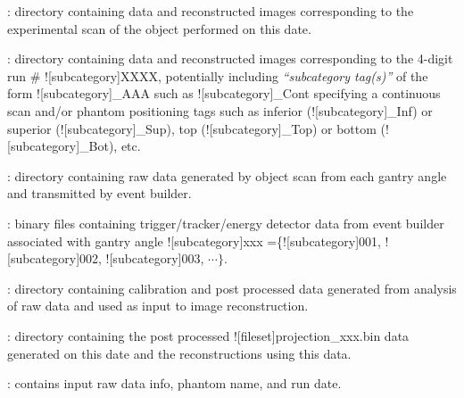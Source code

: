 \begin{tcbenvironment}
\begin{tcbparagraph}
\begin{ThinEnum}
\begin{ThinEnum}
\begin{ThinEnum}
                \item {} : directory containing data and reconstructed images corresponding to the experimental scan of the object performed on this date.
                \begin{ThinEnum}
                    \item {} : directory containing data and reconstructed images corresponding to the 4-digit run \# \docentry![subcategory]{XXXX}, potentially including \emph{``subcategory tag(s)''} of the form \docentry![subcategory]{\_AAA} such as  \docentry![subcategory]{\_Cont} specifying a continuous scan and/or phantom positioning tags such as inferior (\docentry![subcategory]{\_Inf}) or superior (\docentry![subcategory]{\_Sup}), top (\docentry![subcategory]{\_Top}) or bottom (\docentry![subcategory]{\_Bot}), etc.
                    \begin{ThinEnum}
                        \item {} : directory containing raw data generated by object scan from each gantry angle and transmitted by event builder.
                        \begin{ThinEnum}
                            \item {} : binary files containing trigger/tracker/energy detector data from event builder associated with gantry angle \docentry![subcategory]{xxx} =\{\docentry![subcategory]{001}, \docentry![subcategory]{002}, \docentry![subcategory]{003}, $\cdots\}$.
                        \end{ThinEnum}%
                        \item {} : directory containing calibration and post processed data generated from analysis of raw data and used as input to image reconstruction.
                        \begin{ThinEnum}
					\item {} : directory containing the post processed \docentry![fileset]{projection\_xxx.bin} data generated on this date and the reconstructions using this data.
					\begin{ThinEnum}
                            		\item {} : contains input raw data info, phantom name, and run date.

\end{ThinEnum}
\end{ThinEnum}
\end{ThinEnum}
\end{ThinEnum}
\end{ThinEnum}
\end{ThinEnum}
\end{ThinEnum}
\end{tcbparagraph}
\end{tcbenvironment}
